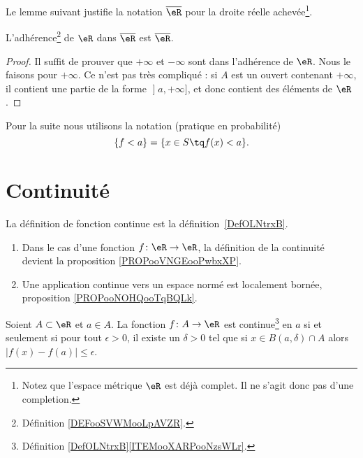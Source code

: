 Le lemme suivant justifie la notation \( \overline{ \eR }\) pour la droite réelle achevée\footnote{Notez que l'espace métrique \( \eR\) est déjà complet. Il ne s'agit donc pas d'une completion.}.
\begin{lemma}       \label{LEMooPZXHooEEXsTC}
	L'adhérence\footnote{Définition \ref{DEFooSVWMooLpAVZR}.} de \( \eR\) dans \( \overline{ \eR }\) est \( \overline{ \eR }\).
\end{lemma}

\begin{proof}
	Il suffit de prouver que \( +\infty\) et \( -\infty\) sont dans l'adhérence de \( \eR\). Nous le faisons pour \( +\infty\). Ce n'est pas très compliqué : si \( A\) est un ouvert contenant \( +\infty\), il contient une partie de la forme \( \mathopen] a , +\infty \mathclose]\), et donc contient des éléments de \( \eR\).
\end{proof}

Pour la suite nous utilisons la notation (pratique en probabilité)
\begin{equation}
	\{ f<a \}=\{ x\in S\tq f(x)<a \}.
\end{equation}


\section{Continuité}

La définition de fonction continue est la définition~\ref{DefOLNtrxB}.

\begin{enumerate}
	\item
	      Dans le cas d'une fonction \( f\colon \eR\to \eR\), la définition de la continuité devient la proposition \ref{PROPooVNGEooPwbxXP}.
	\item
	      Une application continue vers un espace normé est localement bornée, proposition \ref{PROPooNOHQooTqBQLk}.
\end{enumerate}

\begin{proposition}      \label{PROPooVNGEooPwbxXP}
	Soient \( A\subset \eR\) et \( a\in A\). La fonction \( f\colon A\to \eR\) est continue\footnote{Définition \ref{DefOLNtrxB}\ref{ITEMooXARPooNzsWLr}.} en \( a\) si et seulement si pour tout \( \epsilon>0\), il existe un \( \delta>0\) tel que si \( x\in B(a,\delta)\cap A\) alors \( | f(x)-f(a) |\leq \epsilon\).
\end{proposition}

